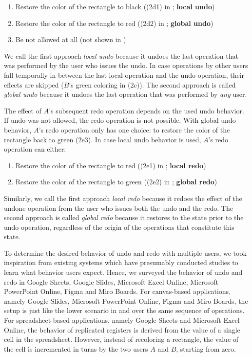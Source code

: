 \documentclass[sigplan,natbib=false,review]{acmart}
\begin{document}
\begin{enumerate}
  \item Restore the color of the rectangle to black
    ((2d1) in ; \textbf{local undo})
  \item Restore the color of the rectangle to red
    ((2d2) in ; \textbf{global undo})
  \item Be not allowed at all (not shown in )
\end{enumerate}

We call the first approach \emph{local undo} because it undoes the last
operation that was performed by the user who issues the undo.
In case operations by other users fall temporally in between the last
local operation and the undo operation, their effects are skipped
($B$'s green coloring in (2c)).
The second approach is called \emph{global undo} because it undoes
the last operation that was performed by \emph{any} user.

The effect of $A$'s subsequent redo operation depends on the used undo behavior.
If undo was not allowed, the redo operation is not possible.
With global undo behavior, $A$'s redo operation only has one choice:
to restore the color of the rectangle back to green (2e3).
In case local undo behavior is used, $A$'s redo operation can either:

\begin{enumerate}
  \item Restore the color of the rectangle to red
    ((2e1) in ; \textbf{local redo})
  \item Restore the color of the rectangle to green
    ((2e2) in ; \textbf{global redo})
\end{enumerate}

Similarly, we call the first approach \emph{local redo} because it redoes the
effect of the undone operation from the user who issues both the undo and the redo.
The second approach is called \emph{global redo} because it restores to the
state prior to the undo operation, regardless of the origin of the
operations that constitute this state.

To determine the desired behavior of undo and redo with multiple users,
we took inspiration from existing systems which have presumably conducted
studies to learn what behavior users expect.
Hence, we surveyed the behavior of undo and redo in Google Sheets, Google Slides,
Microsoft Excel Online, Microsoft PowerPoint Online, Figma and Miro Boards.
For canvas-based applications, namely Google Slides, Microsoft PowerPoint Online,
Figma and Miro Boards, the setup is just like the lower scenario in
 and over the same sequence of operations.
For spreadsheet-based applications, namely Google Sheets and Microsoft Excel Online,
the behavior of replicated registers is derived from the value of a single cell
in the spreadsheet.
However, instead of recoloring a rectangle, the value of the cell is incremented
in turns by the two users $A$ and $B$, starting from zero.
\end{document}
